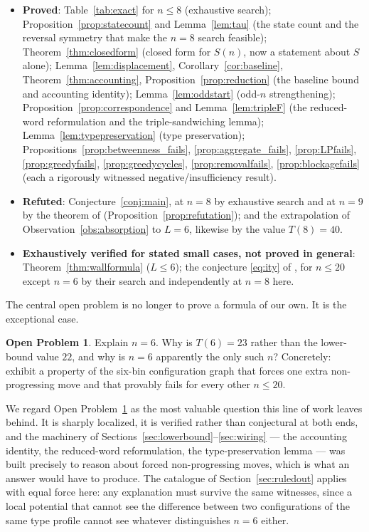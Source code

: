 \documentclass[11pt]{amsart}
\theoremstyle{plain}
\theoremstyle{definition}
\newtheorem{openproblem}[theorem]{Open Problem}
\theoremstyle{remark}
\begin{document}
\begin{itemize}[leftmargin=*]
\item \textbf{Proved}: Table~\ref{tab:exact} for $n\le 8$ (exhaustive search); Proposition~\ref{prop:statecount} and Lemma~\ref{lem:tau} (the state count and the reversal symmetry that make the $n=8$ search feasible); Theorem~\ref{thm:closedform} (closed form for $S(n)$, now a statement about $S$ alone); Lemma~\ref{lem:displacement}, Corollary~\ref{cor:baseline}, Theorem~\ref{thm:accounting}, Proposition~\ref{prop:reduction} (the baseline bound and accounting identity); Lemma~\ref{lem:oddstart} (odd-$n$ strengthening); Proposition~\ref{prop:correspondence} and Lemma~\ref{lem:tripleF} (the reduced-word reformulation and the triple-sandwiching lemma); Lemma~\ref{lem:typepreservation} (type preservation); Propositions~\ref{prop:betweenness_fails}, \ref{prop:aggregate_fails}, \ref{prop:LPfails}, \ref{prop:greedyfails}, \ref{prop:greedycycles}, \ref{prop:removalfails}, \ref{prop:blockagefails} (each a rigorously witnessed negative/insufficiency result).
\item \textbf{Refuted}: Conjecture~\ref{conj:main}, at $n=8$ by exhaustive search and at $n=9$ by the theorem of \cite{ITY} (Proposition~\ref{prop:refutation}); and the extrapolation of Observation~\ref{obs:absorption} to $L=6$, likewise by the value $T(8)=40$.
\item \textbf{Exhaustively verified for stated small cases, not proved in general}: Theorem~\ref{thm:wallformula} ($L\le 6$); the conjecture \eqref{eq:ity} of \cite{ITY}, for $n\le 20$ except $n=6$ by their search and independently at $n=8$ here.
\end{itemize}

The central open problem is no longer to prove a formula of our own. It is the exceptional case.

\begin{openproblem}
\label{open:six}
Explain $n=6$. Why is $T(6)=23$ rather than the lower-bound value $22$, and why is $n=6$ apparently the only such $n$? Concretely: exhibit a property of the six-bin configuration graph that forces one extra non-progressing move and that provably fails for every other $n\le 20$.
\end{openproblem}

We regard Open Problem~\ref{open:six} as the most valuable question this line of work leaves behind. It is sharply localized, it is verified rather than conjectural at both ends, and the machinery of Sections~\ref{sec:lowerbound}--\ref{sec:wiring} --- the accounting identity, the reduced-word reformulation, the type-preservation lemma --- was built precisely to reason about forced non-progressing moves, which is what an answer would have to produce. The catalogue of Section~\ref{sec:ruledout} applies with equal force here: any explanation must survive the same witnesses, since a local potential that cannot see the difference between two configurations of the same type profile cannot see whatever distinguishes $n=6$ either.
\end{document}
